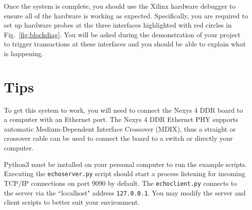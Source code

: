 \documentclass[11pt]{article}
\begin{document}
Once the system is complete, you should use the Xilinx hardware debugger to ensure all of the hardware is working as expected.
Specifically, you are required to set up hardware probes at the three interfaces highlighted with red circles in Fig.~\ref{fig:blockdiag}.
You will be asked during the demonstration of your project to trigger transactions at these interfaces and you should be able to explain what is happening.

\section{Tips}

To get this system to work, you will need to connect the Nexys 4 DDR board to a computer with an Ethernet port.
The Nexys 4 DDR Ethernet PHY supports automatic Medium-Dependent Interface Crossover (MDIX), thus a straight or crossover cable can be used to connect the board to a switch or directly your computer.

Python3 must be installed on your personal computer to run the example scripts.
Executing the \verb|echoserver.py| script should start a process listening for incoming TCP/IP connections on port 9090 by default.
The \verb|echoclient.py| connects to the server via the ``localhost" address \verb|127.0.0.1|. 
You may modify the server and client scripts to better suit your environment.


\newpage
\printbibliography
\end{document}
